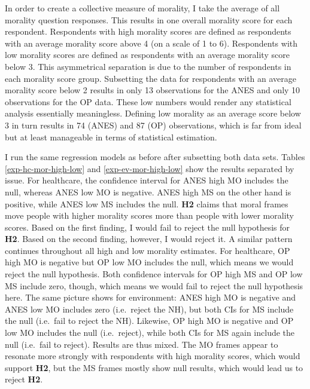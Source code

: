 \documentclass[12pt,econ]{sources/authesis}
\begin{document}
In order to create a collective measure of morality, I take the average of all morality question responses. This results in one overall morality score for each respondent. Respondents with high morality scores are defined as respondents with an average morality score above 4 (on a scale of 1 to 6). Respondents with low morality scores are defined as respondents with an average morality score below 3. This asymmetrical separation is due to the number of respondents in each morality score group. Subsetting the data for respondents with an average morality score below 2 results in only 13 observations for the ANES and only 10 observations for the OP data. These low numbers would render any statistical analysis essentially meaningless. Defining low morality as an average score below 3 in turn results in 74 (ANES) and 87 (OP) observations, which is far from ideal but at least manageable in terms of statistical estimation.

I run the same regression models as before after subsetting both data sets. Tables \ref{exp-hc-mor-high-low} and \ref{exp-ev-mor-high-low} show the results separated by issue. For healthcare, the confidence interval for ANES high MO includes the null, whereas ANES low MO is negative. ANES high MS on the other hand is positive, while ANES low MS includes the null. \textbf{H2} claims that moral frames move people with higher morality scores more than people with lower morality scores. Based on the first finding, I would fail to reject the null hypothesis for \textbf{H2}. Based on the second finding, however, I would reject it. A similar pattern continues throughout all high and low morality estimates. For healthcare, OP high MO is negative but OP low MO includes the null, which means we would reject the null hypothesis. Both confidence intervals for OP high MS and OP low MS include zero, though, which means we would fail to reject the null hypothesis here. The same picture shows for environment: ANES high MO is negative and ANES low MO includes zero (i.e.~reject the NH), but both CIs for MS include the null (i.e.~fail to reject the NH). Likewise, OP high MO is negative and OP low MO includes the null (i.e.~reject), while both CIs for MS again include the null (i.e.~fail to reject). Results are thus mixed. The MO frames appear to resonate more strongly with respondents with high morality scores, which would support \textbf{H2}, but the MS frames mostly show null results, which would lead us to reject \textbf{H2}.

\ssp

\footnotesize
\end{document}
